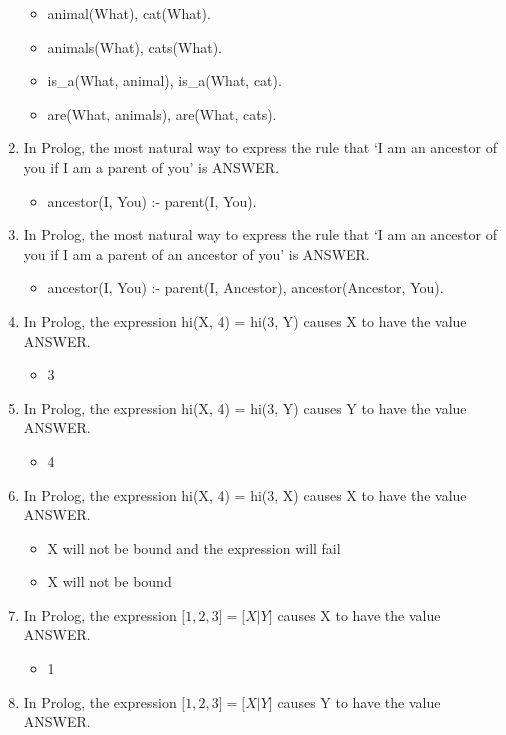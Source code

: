 \documentclass{exam}
\begin{document}
\begin{enumerate}
\begin{itemize}
\item animal(What), cat(What).
\item animals(What), cats(What).
\item is\_a(What, animal), is\_a(What, cat).
\item are(What, animals), are(What, cats).
\end{itemize}
\item In Prolog, the most natural way to express the rule that `I am an ancestor of you if I am a parent of you' is ANSWER.
\begin{itemize}
\item ancestor(I, You) :- parent(I, You).
\end{itemize}
\item In Prolog, the most natural way to express the rule that `I am an ancestor of you if I am a parent of an ancestor of you' is ANSWER.
\begin{itemize}
\item ancestor(I, You) :- parent(I, Ancestor), ancestor(Ancestor, You). 
\end{itemize}
\item In Prolog, the expression hi(X, 4) = hi(3, Y) causes X to have the value ANSWER.
\begin{itemize}
\item 3
\end{itemize}
\item In Prolog, the expression hi(X, 4) = hi(3, Y) causes Y to have the value ANSWER.
\begin{itemize}
\item 4
\end{itemize}
\item In Prolog, the expression hi(X, 4) = hi(3, X) causes X to have the value ANSWER.
\begin{itemize}
\item X will not be bound and the expression will fail
\item X will not be bound
\end{itemize}
\item In Prolog, the expression $\lbrack 1, 2, 3\rbrack = \lbrack X | Y\rbrack$ causes X to have the value ANSWER.
\begin{itemize}
\item 1
\end{itemize}
\item In Prolog, the expression $\lbrack 1, 2, 3\rbrack = \lbrack X | Y\rbrack$ causes Y to have the value ANSWER.

\end{enumerate}
\end{document}
